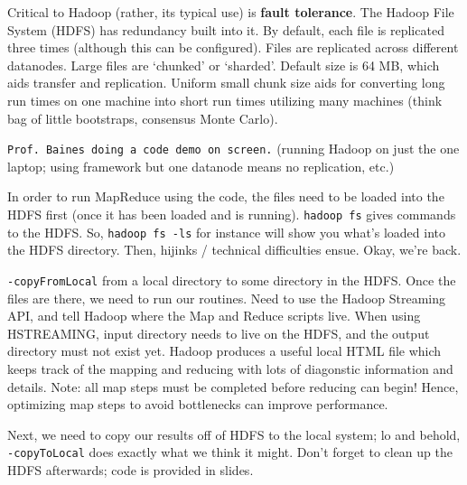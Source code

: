 \documentclass[12pt,letterpaper]{article}
\begin{document}
Critical to Hadoop (rather, its typical use) is \textbf{fault tolerance}. The Hadoop File System (HDFS) has redundancy built into it. By default, each file is replicated three times (although this can be configured). Files are replicated across different datanodes. Large files are `chunked' or `sharded'. Default size is 64 MB, which aids transfer and replication. Uniform small chunk size aids for converting long run times on one machine into short run times utilizing many machines (think bag of little bootstraps, consensus Monte Carlo). 

\texttt{Prof. Baines doing a code demo on screen.} (running Hadoop on just the one laptop; using framework but one datanode means no replication, etc.)

In order to run MapReduce using the code, the files need to be loaded into the HDFS first (once it has been loaded and is running). \texttt{hadoop fs} gives commands to the HDFS. So, \texttt{hadoop fs -ls} for instance will show you what's loaded into the HDFS directory. Then, hijinks / technical difficulties ensue. Okay, we're back.

\texttt{-copyFromLocal} from a local directory to some directory in the HDFS. Once the files are there, we need to run our routines. Need to use the Hadoop Streaming API, and tell Hadoop where the Map and Reduce scripts live. When using HSTREAMING, input directory needs to live on the HDFS, and the output directory must not exist yet. Hadoop produces a useful local HTML file which keeps track of the mapping and reducing with lots of diagonstic information and details. Note: all map steps must be completed before reducing can begin! Hence, optimizing map steps to avoid bottlenecks can improve performance.

Next, we need to copy our results off of HDFS to the local system; lo and behold, \texttt{-copyToLocal} does exactly what we think it might. Don't forget to clean up the HDFS afterwards; code is provided in slides. \\
\end{document}

